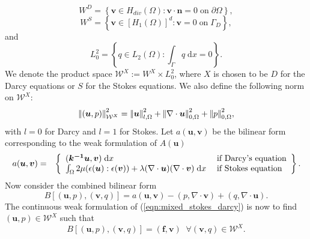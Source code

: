 \begin{equation*}
W^{D}=\left\lbrace \boldsymbol{v} \in H_{div}(\Omega): \boldsymbol{v} \cdot \boldsymbol{n} = 0 \; \mbox{on} \; \partial \Omega \right\rbrace,
\end{equation*}
\begin{equation*}
W^{S}=\left\lbrace \boldsymbol{v} \in [H_{1}(\Omega)]^{d}: \boldsymbol{v} = 0 \; \mbox{on} \; \Gamma_{D} \right\rbrace,
\end{equation*}
and 
\begin{equation*}
L^{2}_{0}=\left\lbrace q \in L_{2}(\Omega): \int_{\Gamma} q \; \mbox{d}x=0 \right\rbrace.
\end{equation*}
We denote the product space $\mathcal{W}^{X}:=W^{X} \times L^{2}_{0}$, where $X$ is chosen to be $D$ for the Darcy equations or $S$ for the Stokes equations. We also define the following norm on $\mathcal{W}^{X}$:
\begin{equation*}
{\left\vert\kern-0.25ex\left\vert (\boldsymbol{u},p) \right\vert\kern-0.25ex\right\vert}_{\mathcal{W}^{X}}^{2}={\left\vert\kern-0.25ex\left\vert \boldsymbol{u} \right\vert\kern-0.25ex\right\vert}_{l,\Omega}^{2}+{\left\vert\kern-0.25ex\left\vert \nabla \cdot \boldsymbol{u} \right\vert\kern-0.25ex\right\vert}_{0,\Omega}^{2}+{\left\vert\kern-0.25ex\left\vert p \right\vert\kern-0.25ex\right\vert}_{0,\Omega}^{2},
\end{equation*}
with $l=0$ for Darcy and $l=1$ for Stokes. Let $a(\boldsymbol{u},\boldsymbol{v})$ be the bilinear form corresponding to the weak formulation of $A(\boldsymbol{u})$ 
\begin{eqnarray*}
a(\boldsymbol{u},\boldsymbol{v}) &=& \left\lbrace
  \begin{array}{l l} (\boldsymbol{k^{-1}} \boldsymbol{u},\boldsymbol{v}) \; {\rm d}x     &\; \text{if Darcy's equation}\\
   \int_{\Omega}2\mu (\epsilon(\boldsymbol{u}):\epsilon(\boldsymbol{v}))
                           + \lambda (\nabla \cdot \boldsymbol{u})(\nabla \cdot \boldsymbol{v}) \; {\rm d}x &\; \text{if Stokes equation}
  \end{array} \right \rbrace .
\end{eqnarray*}
Now consider the combined bilinear form
\begin{equation*}
B[(\boldsymbol{u},p),(\boldsymbol{v},q)]=a(\boldsymbol{u},\boldsymbol{v})-(p,\nabla \cdot \boldsymbol{v}) + (q,\nabla \cdot \boldsymbol{u}).
\end{equation*}
The continuous weak formulation of (\ref{eqn:mixed_stokes_darcy}) is now to find $(\boldsymbol{u},p) \in \mathcal{W}^{X}$ such that
%
\begin{equation*}
B[(\boldsymbol{u},p),(\boldsymbol{v},q)]= (\boldsymbol{f},\boldsymbol{v}) \;\; \forall (\boldsymbol{v},q) \in \mathcal{W}^{X}.
\end{equation*}
%

